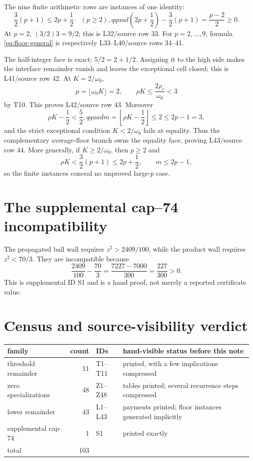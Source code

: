 \documentclass[11pt]{article}
\newcommand{\om}{\omega _0}
\newcommand{\rc}{\rho _c}
\begin{document}
The nine finite arithmetic rows are instances of one identity:
\begin{equation}
 \frac32(p+1)\le 2p+\frac12
 \quad(p\ge2),qquad
 \left(2p+\frac12\right)-\frac32(p+1)=\frac{p-2}{2}\ge0.
 \label{eq:floor-general}
\end{equation}
At \(p=2\), \((3/2)3=9/2\); this is L32/source row 33.
For \(p=2,\ldots,9\), formula \eqref{eq:floor-general} is respectively
L33--L40/source rows 34--41.

The half-integer face is exact:
\(5/2=2+1/2\).  Assigning it to the high side makes the interface
remainder vanish and leaves the exceptional cell closed; this is
L41/source row 42.  At \(K=2/\om\),
\[
 p=\lfloor\om K\rfloor=2,
 \qquad \rho K\le\frac{2\rc}{\om}<3
\]
by T10.  This proves L42/source row 43.  Moreover
\[
 \rho K-\frac12<\frac52,qquad
 m=\left\lfloor\rho K-\frac12\right\rfloor\le2
 \le 2p-1=3,
\]
and the strict exceptional condition \(K<2/\om\) fails at equality.
Thus the complementary average-floor branch owns the equality face,
proving L43/source row 44.
More generally, if \(K\ge2/\om\), then \(p\ge2\) and
\[
 \rho K<\frac32(p+1)\le2p+\frac12,
 \qquad m\le2p-1,
\]
so the finite instances conceal no unproved large-\(p\) case.

\section{The supplemental cap--74 incompatibility}

The propagated ball wall requires \(z^2>2409/100\), while the product
wall requires \(z^2<70/3\).  They are incompatible because
\[
 \frac{2409}{100}-\frac{70}{3}
 =\frac{7227-7000}{300}=\frac{227}{300}>0.
\]
This is supplemental ID S1 and is a hand proof, not merely a reported
certificate value.

\section{Census and source-visibility verdict}

\begin{center}
\begin{tabular}{l|r|l|l}
\toprule
family&count&IDs&hand-visible status before this note\\
\midrule
threshold remainder&11&T1--T11&printed, with a few implications compressed\\
zero specializations&48&Z1--Z48&tables printed; several recurrence steps compressed\\
lower remainder&43&L1--L43&payments printed; floor instances generated implicitly\\
supplemental cap--74&1&S1&printed exactly\\
\midrule
total&103&&\\
\bottomrule
\end{tabular}
\end{center}
\end{document}
